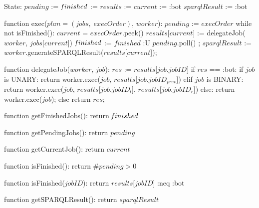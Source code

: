 State:
    $pending$ := {}
    $\textrm{\emph{f}}inished$ := {}
    $results$ := {}
    $current$ := :bot
    $sparqlResult$ := :bot

function exec($plan = (jobs, \; execOrder)$, $worker$):
    $pending$ := $execOrder$
    while not isFinished():
        $current$ = $execOrder$.peek()
        $results$[$current$] := delegateJob($worker$, $jobs$[$current$])
        $\textrm{\emph{f}}inished$ := $finished$ :U { $pending$.poll() };
    $sparqlResult$ := $worker$.generateSPARQLResult($results$[$current$]);

function delegateJob($worker$, $job$):
    $res$ := $results$[$job$.$jobID$]
    if $res$ == :bot:
        if $job$ is UNARY:
            return worker.exec($job$, $results$[$job$.$jobID_{prev}$])
        elif $job$ is BINARY:
            return worker.exec($job$, $results$[$job$.$jobID_l$], $results$[$job$.$jobID_r$])
        else:
            return worker.exec($job$);
    else
        return $res$;

function getFinishedJobs():
    return $\textrm{\emph{f}}inished$

function getPendingJobs():
    return $pending$

function getCurrentJob():
    return $current$

function isFinished():
    return $\#pending > 0$

function isFinished($jobID$):
    return $results$[$jobID$] :neq :bot

function getSPARQLResult():
    return $sparqlResult$
